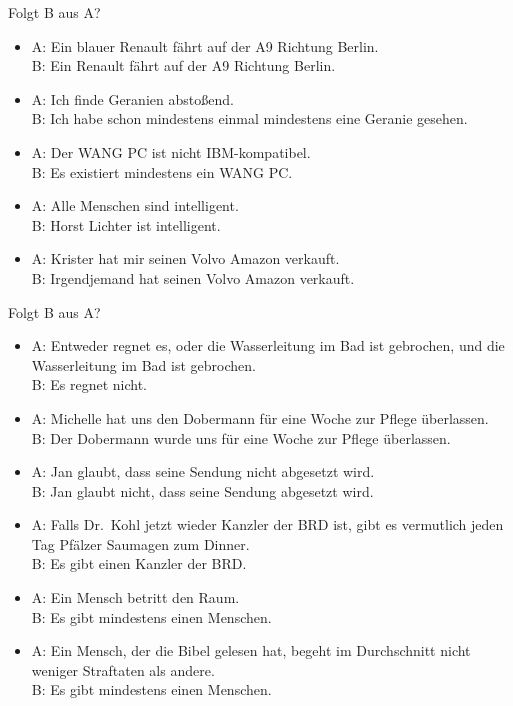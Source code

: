 \begin{frame}
  {Folgt B aus A?} %
  \onslide<+->
  \begin{itemize}[<+->]
    \item A: Ein blauer Renault fährt auf der A9 Richtung Berlin.\\
      B: Ein Renault fährt auf der A9 Richtung Berlin.
    \item A: Ich finde Geranien abstoßend.\\
      B: Ich habe schon mindestens einmal mindestens eine Geranie gesehen.
    \item A: Der WANG PC ist nicht IBM-kompatibel.\\
      B: Es existiert mindestens ein WANG PC.
    \item A: Alle Menschen sind intelligent.\\
      B: Horst Lichter ist intelligent.
    \item A: Krister hat mir seinen Volvo Amazon verkauft.\\
      B: Irgendjemand hat seinen Volvo Amazon verkauft.
  \end{itemize}
\end{frame}

\begin{frame}
  {Folgt B aus A?} %
  \begin{itemize}[<+->]
    \item A: Entweder regnet es, oder die Wasserleitung im Bad ist gebrochen, und die Wasserleitung im Bad ist gebrochen.\\
      B: Es regnet nicht.
    \item A: Michelle hat uns den Dobermann für eine Woche zur Pflege überlassen.\\
      B: Der Dobermann wurde uns für eine Woche zur Pflege überlassen.
    \item A: Jan glaubt, dass seine Sendung nicht abgesetzt wird.\\
      B: Jan glaubt nicht, dass seine Sendung abgesetzt wird.
    \item A: Falls Dr.\ Kohl jetzt wieder Kanzler der BRD ist, gibt es vermutlich jeden Tag Pfälzer Saumagen zum Dinner.\\
      B: Es gibt einen Kanzler der BRD.
    \item A: Ein Mensch betritt den Raum.\\
      B: Es gibt mindestens einen Menschen.
    \item A: Ein Mensch, der die Bibel gelesen hat, begeht im Durchschnitt nicht weniger Straftaten als andere.\\
      B: Es gibt mindestens einen Menschen.
  \end{itemize}
\end{frame}

